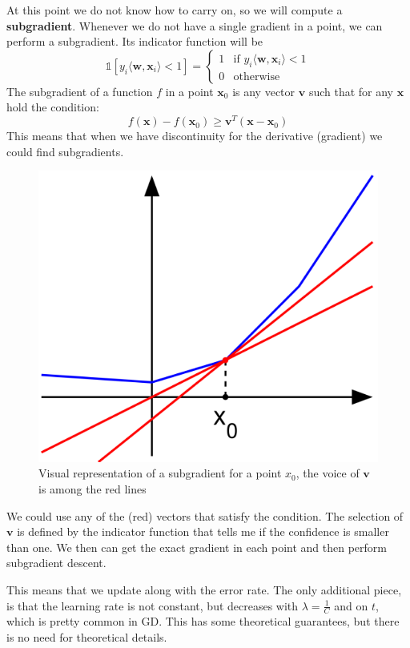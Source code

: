 At this point we do not know how to carry on, so we will compute a \textbf{subgradient}.
Whenever we do not have a single gradient in a point, we can perform a subgradient.
Its indicator function will be
\[
	\mathbb{1}[y_{i}\langle \pmb{w}, \pmb{x}_{i}\rangle < 1] =
	\begin{cases}
		1 & \text{if }y_{i}\langle \pmb{w}, \pmb{x}_{i}\rangle < 1 \\
		0 & \text{otherwise}
	\end{cases}
\]
The subgradient of a function $f$ in a point $\pmb{x}_{0}$ is any vector
$\pmb{v}$ such that for any $\pmb{x}$ hold the condition:
\[
	f(\pmb{x}) - f(\pmb{x}_{0}) \geq \pmb{v}^{T}(\pmb{x}- \pmb{x}_{0})
\]
This means that when we have discontinuity for the derivative (gradient) we could
find subgradients.
\begin{figure}[H]
	\centering
	\includegraphics[scale=0.3]{
        images/13_SupportVectorMachines_subgradient.png
    }
	\caption{Visual representation of a subgradient for a point $x_{0}$, the voice
	of $\pmb{v}$ is among the red lines}
	\label{fig:subgradient}
\end{figure}
We could use any of the (red) vectors that satisfy the condition. The selection of
$\pmb{v}$ is defined by the indicator function that tells me if the confidence is
smaller than one. We then can get the exact gradient in each point and then
perform subgradient descent.

This means that we update along with the error rate. The only additional piece,
is that the learning rate is not constant, but decreases with $\lambda = \frac{1}{C}$
and on $t$, which is pretty common in GD. This has some theoretical guarantees,
but there is no need for theoretical details.\\